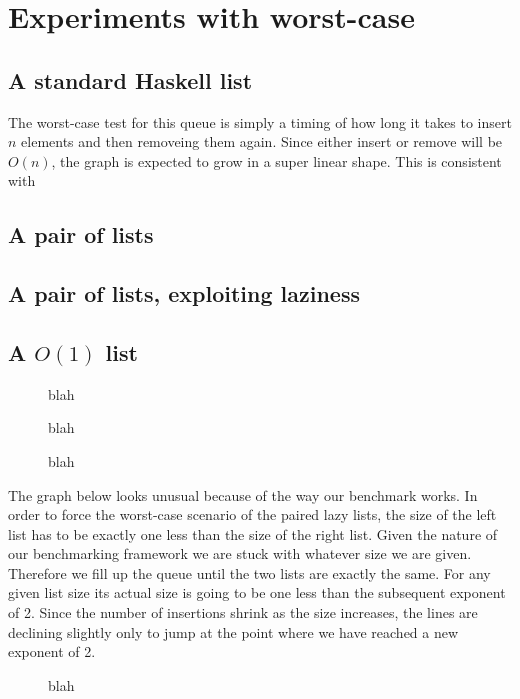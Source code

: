 \section*{Experiments with worst-case}

\subsection*{A standard Haskell list}
The worst-case test for this queue is simply a timing of how long it takes to insert $n$ elements and then removeing them again. Since either insert or remove will be $O(n)$, the graph is expected to grow in a super linear shape. This is consistent with 
\subsection*{A pair of lists}
\subsection*{A pair of lists, exploiting laziness}
\subsection*{A $O(1)$ list}

\begin{figure}[htb]
\centering

\caption{blah}
\label{simple}
\end{figure}

\begin{figure}[htb]
\centering

\caption{blah}
\label{simple-high}
\end{figure}


\begin{figure}[htb]
\centering

\caption{blah}
\label{reuse-remove-2}
\end{figure}

The graph below looks unusual because of the way our benchmark works. In order to force the worst-case scenario of the paired lazy lists, the size of the left list has to be exactly one less than the size of the right list. Given the nature of our benchmarking framework we are stuck with whatever size we are given. Therefore we fill up the queue until the two lists are exactly the same. For any given list size its actual size is going to be one less than the subsequent exponent of 2. Since the number of insertions shrink as the size increases, the lines are declining slightly only to jump at the point where we have reached a new exponent of 2.


\begin{figure}[htb]
\centering

\caption{blah}
\label{reuse-remove-4}
\end{figure}

